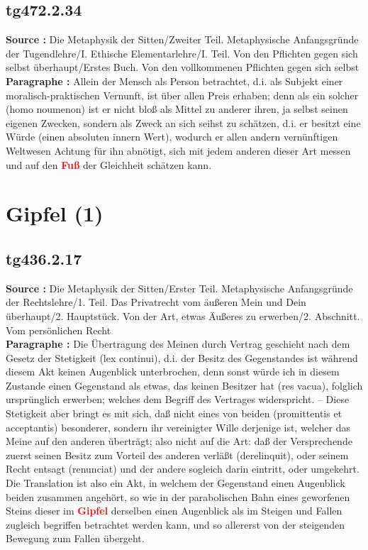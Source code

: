 \documentclass[a4paper,12pt,twoside]{book}
\newcommand{\match}[1]{\textcolor{red}{\textbf{#1}}}
\newcommand{\unnumberedsection}[1]{
	\section*{#1}
	\addcontentsline{toc}{section}{#1}
	\markright{#1}
}
\begin{document}
	\subsection*{tg472.2.34} 
	\textbf{Source : }Die Metaphysik der Sitten/Zweiter Teil. Metaphysische Anfangsgründe der Tugendlehre/I. Ethische Elementarlehre/I. Teil. Von den Pflichten gegen sich selbst überhaupt/Erstes Buch. Von den vollkommenen Pflichten gegen sich selbst\\  
	
	\textbf{Paragraphe : }Allein der Mensch als Person betrachtet, d.i. als Subjekt einer moralisch-praktischen Vernunft, ist über allen Preis erhaben; denn als ein solcher (homo noumenon) ist er nicht bloß als Mittel zu anderer ihren, ja selbst seinen eigenen Zwecken, sondern als Zweck an sich seihst zu schätzen, d.i. er besitzt eine Würde (einen absoluten innern Wert), wodurch er allen andern vernünftigen Weltwesen Achtung für ihn abnötigt, sich mit jedem anderen dieser Art messen und auf den \match{Fuß} der Gleichheit schätzen kann. 
	
	\unnumberedsection{Gipfel (1)} 
	\subsection*{tg436.2.17} 
	\textbf{Source : }Die Metaphysik der Sitten/Erster Teil. Metaphysische Anfangsgründe der Rechtslehre/1. Teil. Das Privatrecht vom äußeren Mein und Dein überhaupt/2. Hauptstück. Von der Art, etwas Äußeres zu erwerben/2. Abschnitt. Vom persönlichen Recht\\  
	
	\textbf{Paragraphe : }Die Übertragung des Meinen durch Vertrag geschieht nach dem Gesetz der Stetigkeit (lex continui), d.i. der Besitz des Gegenstandes ist während diesem Akt keinen Augenblick unterbrochen, denn sonst würde ich in diesem Zustande einen Gegenstand als etwas, das keinen Besitzer hat (res vacua), folglich ursprünglich erwerben; welches dem Begriff des Vertrages widerspricht. – Diese Stetigkeit aber bringt es mit sich, daß nicht eines von beiden (promittentis et acceptantis) besonderer, sondern ihr vereinigter Wille derjenige ist, welcher das Meine auf den anderen überträgt; also nicht auf die Art: daß der Versprechende zuerst seinen Besitz zum Vorteil des anderen verläßt (derelinquit), oder seinem Recht entsagt (renunciat) und der andere sogleich darin eintritt, oder umgekehrt. Die Translation ist also ein Akt, in welchem der Gegenstand einen Augenblick beiden zusammen angehört, so wie in der parabolischen Bahn eines geworfenen Steins dieser im \match{Gipfel} derselben einen Augenblick als im Steigen und Fallen zugleich begriffen betrachtet werden kann, und so allererst von der steigenden Bewegung zum Fallen übergeht. 
	
\end{document}
